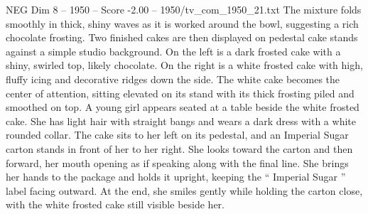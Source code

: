 \begin{textsample}{NEG Dim 8 – 1950 – Score -2.00 – 1950/tv\_com\_1950\_21.txt}
The mixture folds smoothly in thick, shiny waves as it is worked around the bowl, suggesting a rich chocolate frosting.
Two finished cakes are then displayed on pedestal cake stands against a simple studio background.
On the left is a dark frosted cake with a shiny, swirled top, likely chocolate.
On the right is a white frosted cake with high, fluffy icing and decorative ridges down the side.
The white cake becomes the center of attention, sitting elevated on its stand with its thick frosting piled and smoothed on top.
A young girl appears seated at a table beside the white frosted cake.
She has light hair with straight bangs and wears a dark dress with a white rounded collar.
The cake sits to her left on its pedestal, and an Imperial Sugar carton stands in front of her to her right.
She looks toward the carton and then forward, her mouth opening as if speaking along with the final line.
She brings her hands to the package and holds it upright, keeping the “ Imperial Sugar ” label facing outward.
At the end, she smiles gently while holding the carton close, with the white frosted cake still visible beside her.

\end{textsample}
